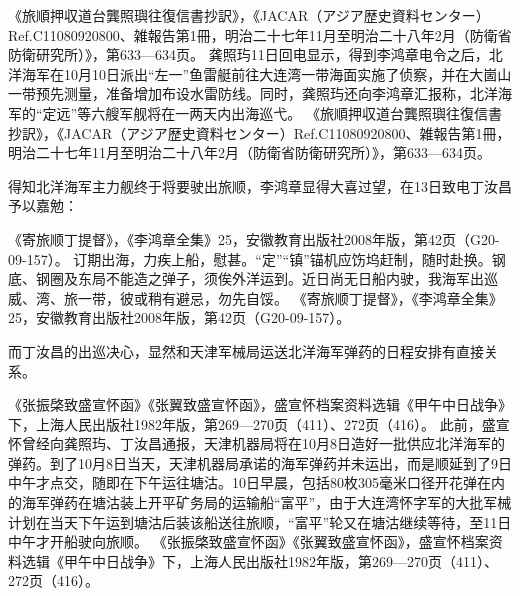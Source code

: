 \documentclass[12pt,UTF8]{ctexbook}
\begin{document}
《旅順押収道台龔照璵往復信書抄訳》，《JACAR（アジア歴史資料センター）Ref.C11080920800、雑報告第1冊，明治二十七年11月至明治二十八年2月（防衛省防衛研究所）》，第633—634页。
龚照玙11日回电显示，得到李鸿章电令之后，北洋海军在10月10日派出“左一”鱼雷艇前往大连湾一带海面实施了侦察，并在大崮山一带预先测量，准备增加布设水雷防线。同时，龚照玙还向李鸿章汇报称，北洋海军的“定远”等六艘军舰将在一两天内出海巡弋。 《旅順押収道台龔照璵往復信書抄訳》，《JACAR（アジア歴史資料センター）Ref.C11080920800、雑報告第1冊，明治二十七年11月至明治二十八年2月（防衛省防衛研究所）》，第633—634页。

得知北洋海军主力舰终于将要驶出旅顺，李鸿章显得大喜过望，在13日致电丁汝昌予以嘉勉：

《寄旅顺丁提督》，《李鸿章全集》25，安徽教育出版社2008年版，第42页（G20-09-157）。
订期出海，力疾上船，慰甚。“定”“镇”锚机应饬坞赶制，随时赴换。钢底、钢圈及东局不能造之弹子，须俟外洋运到。近日尚无日船内驶，我海军出巡威、湾、旅一带，彼或稍有避忌，勿先自馁。 《寄旅顺丁提督》，《李鸿章全集》25，安徽教育出版社2008年版，第42页（G20-09-157）。

而丁汝昌的出巡决心，显然和天津军械局运送北洋海军弹药的日程安排有直接关系。

《张振棨致盛宣怀函》《张翼致盛宣怀函》，盛宣怀档案资料选辑《甲午中日战争》下，上海人民出版社1982年版，第269—270页（411）、272页（416）。
此前，盛宣怀曾经向龚照玙、丁汝昌通报，天津机器局将在10月8日造好一批供应北洋海军的弹药。到了10月8日当天，天津机器局承诺的海军弹药并未运出，而是顺延到了9日中午才点交，随即在下午运往塘沽。10日早晨，包括80枚305毫米口径开花弹在内的海军弹药在塘沽装上开平矿务局的运输船“富平”，由于大连湾怀字军的大批军械计划在当天下午运到塘沽后装该船送往旅顺，“富平”轮又在塘沽继续等待，至11日中午才开船驶向旅顺。 《张振棨致盛宣怀函》《张翼致盛宣怀函》，盛宣怀档案资料选辑《甲午中日战争》下，上海人民出版社1982年版，第269—270页（411）、272页（416）。
\end{document}
